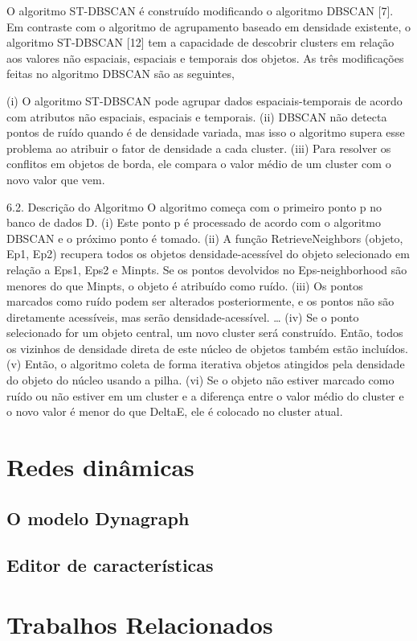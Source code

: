 O algoritmo ST-DBSCAN é construído modificando o algoritmo DBSCAN [7]. Em contraste com o algoritmo de agrupamento baseado em densidade existente, o algoritmo ST-DBSCAN [12] tem a capacidade de descobrir clusters em relação aos valores não espaciais, espaciais e temporais dos objetos. As três modificações feitas no algoritmo DBSCAN são as seguintes,

(i) O algoritmo ST-DBSCAN pode agrupar dados espaciais-temporais de acordo com atributos não espaciais, espaciais e temporais.
(ii) DBSCAN não detecta pontos de ruído quando é de densidade variada, mas isso o algoritmo supera esse problema ao atribuir o fator de densidade a cada cluster.
(iii) Para resolver os conflitos em objetos de borda, ele compara o valor médio de um cluster com o novo valor que vem.

6.2. Descrição do Algoritmo
O algoritmo começa com o primeiro ponto p no banco de dados D.
(i) Este ponto p é processado de acordo com o algoritmo DBSCAN e o próximo ponto é tomado.
(ii) A função RetrieveNeighbors (objeto, Ep1, Ep2) recupera todos os objetos densidade-acessível do objeto selecionado em relação a Eps1, Eps2 e Minpts. Se os pontos devolvidos no Eps-neighborhood são menores do que Minpts, o objeto é atribuído como ruído.
(iii) Os pontos marcados como ruído podem ser alterados posteriormente, e os pontos não são diretamente acessíveis, mas serão densidade-acessível.
…
(iv) Se o ponto selecionado for um objeto central, um novo cluster será construído. Então, todos os vizinhos de densidade direta de este núcleo de objetos também estão incluídos.
(v) Então, o algoritmo coleta de forma iterativa objetos atingidos pela densidade do objeto do núcleo usando a pilha.
(vi) Se o objeto não estiver marcado como ruído ou não estiver em um cluster e a diferença
entre o valor médio do cluster e o novo valor é menor do que DeltaE, ele é colocado no cluster atual.

\section{Redes dinâmicas}
\subsection{O modelo Dynagraph}
\subsection{Editor de características}
\section{Trabalhos Relacionados}

